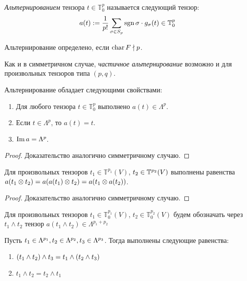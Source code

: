 \begin{definition}
	\textit{Альтернированием} тензора $t \in \mathbb{T}^p_0$ называется следующий тензор:
	\[a(t) := \frac1{p!}\sum_{\sigma \in S_p}\operatorname{\mathop{sgn}}\sigma\cdot g_\sigma(t) \in \mathbb{T}^p_0\]
	
	Альтернирование определено, если $\operatorname{char}{F} \nmid p$.
\end{definition}

\begin{note}
	Как и в симметричном случае, \textit{частичное альтернирование} возможно и для произвольных тензоров типа $(p, q)$.
\end{note}

\begin{proposition} 
	Альтернирование обладает следующими свойствами:
	\begin{enumerate}
		\item Для любого тензора $t \in \mathbb{T}^p_0$ выполнено $a(t) \in \Lambda^p$.
		\item Если $t \in \Lambda^p$, то $a(t) = t$.
		\item $\operatorname{Im}{a} = \Lambda^p$.
	\end{enumerate}
\end{proposition}

\begin{proof}
	Доказательство аналогично симметричному случаю.
\end{proof}

\begin{proposition}
	Для произвольных тензоров $t_1 \in \mathbb{T}^{p_1}(V)$, $t_2 \hm\in \mathbb{T}^{p_2}(V)$ выполнены равенства $a(t_1 \otimes t_2) = a(a(t_1) \otimes t_2) \hm= a(t_1 \otimes a(t_2))$.
\end{proposition}

\begin{proof}
	Доказательство аналогично симметричному случаю.
\end{proof}

\begin{definition}
	Для произвольных тензоров $t_1 \in \mathbb{T}^{p_1}_0(V)$, $t_2 \in \mathbb{T}^{p_2}_0(V)$ будем обозначать через $t_1 \land t_2$ тензор $a(t_1 \land t_2) \in \Lambda^{p_1 + p_2}$
\end{definition}

\begin{proposition}
	Пусть $t_1 \in \Lambda^{p_1}, t_2 \hm\in \Lambda^{p_2}, t_3 \in \Lambda^{p_3}$. Тогда выполнены следующие равенства:
	\begin{enumerate}
		\item $(t_1\land t_2)\hm\land t_3 = t_1\land(t_2\land t_3)$
		
		\item $t_1 \land t_2 = t_2 \land t_1$
	\end{enumerate}
\end{proposition}

